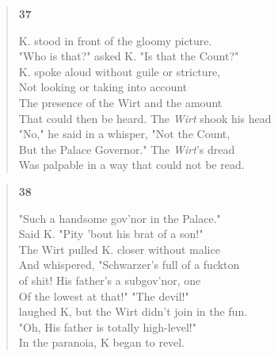 \documentclass{article}
\begin{document}
\begin{verse}
  \begin{center}
    \textbf{37} \\
  \end{center}
  K. stood in front of the gloomy picture. \\
  "Who is that?" asked K. "Is that the Count?" \\
  K. spoke aloud without guile or stricture, \\
  Not looking or taking into account \\
  The presence of the Wirt and the amount \\
  That could then be heard. The \textit{Wirt} shook his head \\
  "No," he said in a whisper, "Not the Count, \\
  But the Palace Governor." The \textit{Wirt}'s dread \\
  Was palpable in a way that could not be read.
\end{verse}

\begin{verse}
  \begin{center}
    \textbf{38} \\
  \end{center}
  "Such a handsome gov'nor in the Palace." \\
  Said K. "Pity 'bout his brat of a son!" \\
  The Wirt pulled K. closer without malice \\
  And whispered, "Schwarzer's full of a fuckton \\
  of shit! His father's a subgov'nor, one \\
  Of the lowest at that!" "The devil!" \\
  laughed K, but the Wirt didn't join in the fun. \\
  "Oh, His father is totally high-level!" \\
  In the paranoia, K began to revel. \\
\end{verse}
\end{document}
